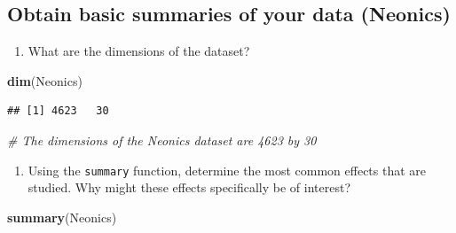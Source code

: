 \documentclass[]{article}
\newenvironment{Shaded}{\begin{snugshade}}{\end{snugshade}}
\newcommand{\KeywordTok}[1]{\textcolor[rgb]{0.13,0.29,0.53}{\textbf{#1}}}
\newcommand{\CommentTok}[1]{\textcolor[rgb]{0.56,0.35,0.01}{\textit{#1}}}
\newcommand{\NormalTok}[1]{#1}
\providecommand{\tightlist}{%
  \setlength{\itemsep}{0pt}\setlength{\parskip}{0pt}}
\begin{document}
\subsection{Obtain basic summaries of your data
(Neonics)}\label{obtain-basic-summaries-of-your-data-neonics}

\begin{enumerate}
\def\labelenumi{\arabic{enumi}.}
\setcounter{enumi}{4}
\tightlist
\item
  What are the dimensions of the dataset?
\end{enumerate}

\begin{Shaded}
\begin{Highlighting}[]
\KeywordTok{dim}\NormalTok{(Neonics)}
\end{Highlighting}
\end{Shaded}

\begin{verbatim}
## [1] 4623   30
\end{verbatim}

\begin{Shaded}
\begin{Highlighting}[]
\CommentTok{# The dimensions of the Neonics dataset are 4623 by 30}
\end{Highlighting}
\end{Shaded}

\begin{enumerate}
\def\labelenumi{\arabic{enumi}.}
\setcounter{enumi}{5}
\tightlist
\item
  Using the \texttt{summary} function, determine the most common effects
  that are studied. Why might these effects specifically be of interest?
\end{enumerate}

\begin{Shaded}
\begin{Highlighting}[]
\KeywordTok{summary}\NormalTok{(Neonics)}
\end{Highlighting}
\end{Shaded}
\end{document}

